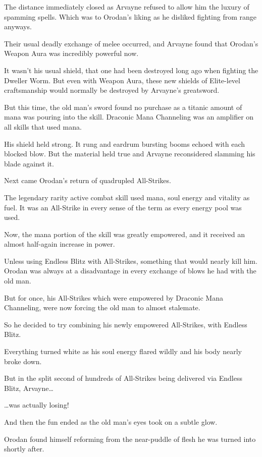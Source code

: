 \documentclass[a4paper,10pt]{book}
\begin{document}
The distance immediately closed as Arvayne refused to allow him the luxury of spamming spells. Which was to Orodan’s liking as he disliked fighting from range anyways.\par
Their usual deadly exchange of melee occurred, and Arvayne found that Orodan’s Weapon Aura was incredibly powerful now.\par
It wasn’t his usual shield, that one had been destroyed long ago when fighting the Dweller Worm. But even with Weapon Aura, these new shields of Elite-level craftsmanship would normally be destroyed by Arvayne’s greatsword.\par
But this time, the old man’s sword found no purchase as a titanic amount of mana was pouring into the skill. Draconic Mana Channeling was an amplifier on all skills that used mana.\par
His shield held strong. It rung and eardrum bursting booms echoed with each blocked blow. But the material held true and Arvayne reconsidered slamming his blade against it.\par
Next came Orodan’s return of quadrupled All-Strikes.\par
The legendary rarity active combat skill used mana, soul energy and vitality as fuel. It was an All-Strike in every sense of the term as every energy pool was used.\par
Now, the mana portion of the skill was greatly empowered, and it received an almost half-again increase in power.\par
Unless using Endless Blitz with All-Strikes, something that would nearly kill him. Orodan was always at a disadvantage in every exchange of blows he had with the old man.\par
But for once, his All-Strikes which were empowered by Draconic Mana Channeling, were now forcing the old man to almost stalemate.\par
So he decided to try combining his newly empowered All-Strikes, with Endless Blitz.\par
Everything turned white as his soul energy flared wildly and his body nearly broke down.\par
But in the split second of hundreds of All-Strikes being delivered via Endless Blitz, Arvayne…\par
…was actually losing!\par
And then the fun ended as the old man’s eyes took on a subtle glow.\par
Orodan found himself reforming from the near-puddle of flesh he was turned into shortly after.\par
\end{document}
